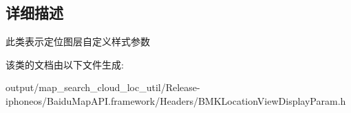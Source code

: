\subsection{详细描述}
此类表示定位图层自定义样式参数 

该类的文档由以下文件生成\+:\begin{DoxyCompactItemize}
\item 
output/map\+\_\+search\+\_\+cloud\+\_\+loc\+\_\+util/\+Release-\/iphoneos/\+Baidu\+Map\+A\+P\+I.\+framework/\+Headers/B\+M\+K\+Location\+View\+Display\+Param.\+h\end{DoxyCompactItemize}

